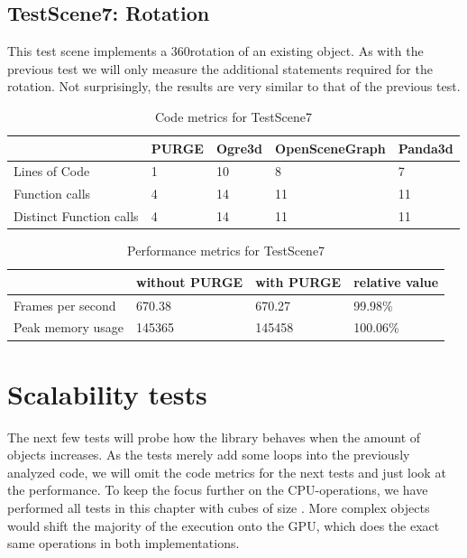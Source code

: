 	\subsection{TestScene7: Rotation}

		This test scene implements a 360\degree rotation of an existing object. As with the previous test we will only measure the additional statements required for the rotation. Not surprisingly, the results are very similar to that of the previous test.

		\begin{table}[htpb]
			\center
			\begin{tabular}{l | l | l | l | l}
				& PURGE & Ogre3d & OpenSceneGraph & Panda3d\\ \hline
				Lines of Code & 1 & 10 & 8 & 7\\
				Function calls & 4 & 14 & 11 & 11\\
				Distinct Function calls & 4 & 14 & 11 & 11\\
			\end{tabular}
			\caption{Code metrics for TestScene7}
		\end{table}

		\begin{table}[htpb]
			\center
			\caption{Performance metrics for TestScene7}
			\begin{tabular}{l | l | l | l}
				& without PURGE & with PURGE & relative value\\ \hline
				Frames per second & 670.38 & 670.27 & 99.98\%\\
				Peak memory usage & 145365 & 145458 & 100.06\%\\
			\end{tabular}
			\label{tbl:Performance7}
		\end{table}

\section{Scalability tests}

	The next few tests will probe how the library behaves when the amount of objects increases. As the tests merely add some loops into the previously analyzed code, we will omit the code metrics for the next tests and just look at the performance. To keep the focus further on the CPU-operations, we have performed all tests in this chapter with cubes of size . More complex objects would shift the majority of the execution onto the GPU, which does the exact same operations in both implementations.

